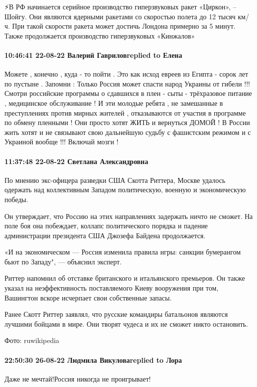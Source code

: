 ⚡В РФ начинается серийное производство гиперзвуковых ракет «Циркон», – Шойгу.
Они являются ядерными ракетами со скоростью полета до 12 тысяч км/ч. При такой скорости ракета может достичь Лондона примерно за 5 минут. Также продолжается производство гиперзвуковых «Кинжалов»


\paragraph{10:46:41 22-08-22 Валерий Гавриловreplied to Елена}

Можете , конечно , куда - то пойти . Это как исход евреев из Египта - сорок лет по пустыне . Запомни : Только Россия может спасти народ Украины от гибели !!! Смотри российские программы о сдавшихся в плен - сыты - трёхразовое питание , медицинское обслуживание ! И эти молодые ребята , не замешанные в преступлениях против мирных жителей , отказываются от участия в программе по обмену пленными ! Они просто хотят ЖИТЬ и вернуться ДОМОЙ ! В России жить хотят и не связывают свою дальнейшую судьбу с фашистским режимом и с Украиной вообще !!! Включай мозги !

\paragraph{11:37:48 22-08-22 Светлана Александровна}

По мнению экс-офицера разведки США Скотта Риттера, Москве удалось одержать над
коллективным Западом политическую, военную и экономическую победы.

Он утверждает, что Россию на этих направлениях задержать ничто не сможет. На
поле боя она побеждает, коллапс политического порядка и падение администрации
президента США Джозефа Байдена продолжается.

«И на экономическом — Россия изменила правила игры: санкции бумерангом бьют по
Западу", — объяснил эксперт.

Риттер напомнил об отставке британского и итальянского премьеров. Он также
указал на неэффективность поставляемого Киеву вооружения при том, Вашингтон
вскоре исчерпает свои собственные запасы.

Ранее Скотт Риттер заявлял, что русские командиры батальонов являются лучшими
бойцами в мире. Они творят чудеса и их не сможет никто остановить.

Фото: ruwikipedia

\paragraph{22:50:30 26-08-22 Людмила Викуловаreplied to Лора}

Даже не мечтай!Россия никогда не проигрывает!


